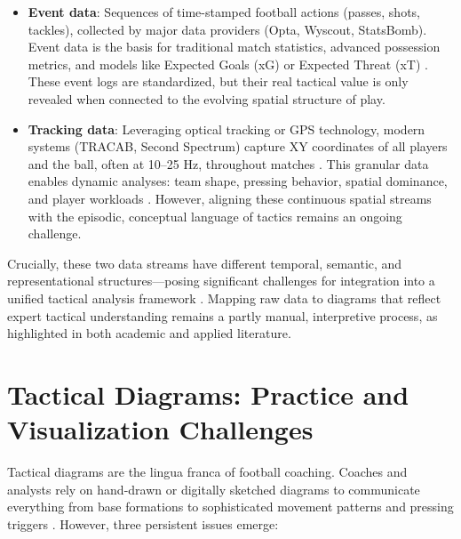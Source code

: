 \documentclass[11pt,a4paper,openright]{report}
\begin{document}
\begin{itemize}
    \item \textbf{Event data}: Sequences of time-stamped football actions (passes, shots, tackles), collected by major data providers (Opta, Wyscout, StatsBomb). Event data is the basis for traditional match statistics, advanced possession metrics, and models like Expected Goals (xG) or Expected Threat (xT) \cite{sarmento2014match}. These event logs are standardized, but their real tactical value is only revealed when connected to the evolving spatial structure of play.
    \item \textbf{Tracking data}: Leveraging optical tracking or GPS technology, modern systems (TRACAB, Second Spectrum) capture XY coordinates of all players and the ball, often at 10–25 Hz, throughout matches \cite{sacha2014feature}. This granular data enables dynamic analyses: team shape, pressing behavior, spatial dominance, and player workloads \cite{morgulev2018sports}. However, aligning these continuous spatial streams with the episodic, conceptual language of tactics remains an ongoing challenge.
\end{itemize}

Crucially, these two data streams have different temporal, semantic, and representational structures—posing significant challenges for integration into a unified tactical analysis framework \cite{sarmento2014match, perin2013soccerstories}. Mapping raw data to diagrams that reflect expert tactical understanding remains a partly manual, interpretive process, as highlighted in both academic and applied literature.

\section*{Tactical Diagrams: Practice and Visualization Challenges}
Tactical diagrams are the lingua franca of football coaching. Coaches and analysts rely on hand-drawn or digitally sketched diagrams to communicate everything from base formations to sophisticated movement patterns and pressing triggers \cite{maiden2023designing, perin2013soccerstories}. However, three persistent issues emerge:
\end{document}
